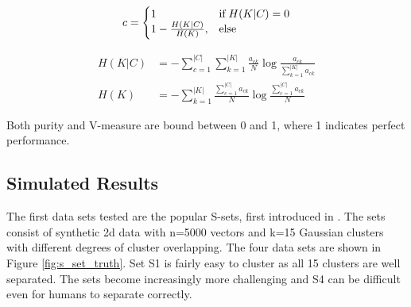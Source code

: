\begin{equation}
\label{eq:completeness}
 c=\left\{
  \begin{array}{@{}ll@{}}
    1  & \text{if} \;  H(K|C) = 0 \\
    1 - \frac{H(K|C)}{H(K)}, & \text{else}
  \end{array}\right.
\end{equation} 

\begin{align}
  \label{eq:H(K|C)}
H(K|C) &=  - \sum_{c=1}^{|C|} \sum_{k=1}^{|K|}\frac{a_{ck}}{N} \log \frac{a_{ck}}{\sum_{k=1}^{|K|}a_{ck}}\\
H(K) &=  - \sum_{k=1}^{|K|} \frac{\sum_{c=1}^{|C|}a_{ck}}{N} \log \frac{\sum_{c=1}^{|C|}a_{ck}}{N}
\end{align}

Both purity and V-measure are bound between 0 and 1, where 1 indicates perfect performance. 


\subsection{Simulated Results}

The first data sets tested are the popular S-sets, first introduced in \cite{Franti2006}. The sets consist of synthetic 2d data with n=5000 vectors and k=15 Gaussian clusters with different degrees of cluster overlapping.   The four data sets are shown in Figure \ref{fig:s_set_truth}. Set S1 is fairly easy to cluster as all 15 clusters  are well separated. The sets become increasingly more challenging and S4 can be difficult even for humans to separate correctly.

